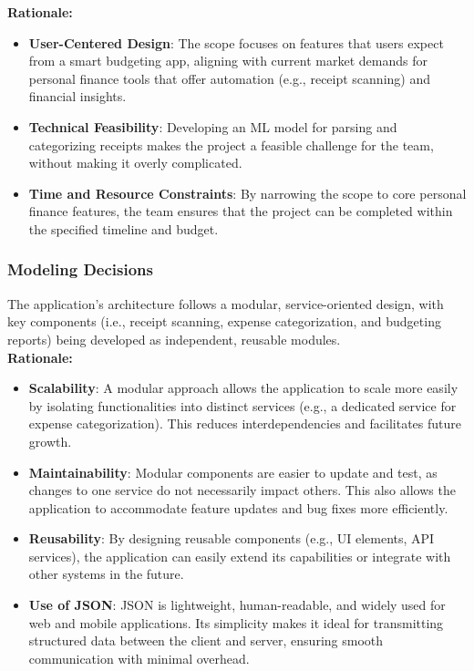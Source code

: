\documentclass[12pt]{article}
\begin{document}
\noindent\textbf{Rationale:}
\begin{itemize}
    \item \textbf{User-Centered Design}: The scope focuses on features that
    users expect from a smart budgeting app, aligning with current market
    demands for personal finance tools that offer automation (e.g., receipt
    scanning) and financial insights. 
    \item \textbf{Technical Feasibility}: Developing an ML model for parsing and
    categorizing receipts makes the project a feasible challenge for the team,
    without making it overly complicated.
    \item \textbf{Time and Resource Constraints}: By narrowing the scope to core
    personal finance features, the team ensures that the project can be
    completed within the specified timeline and budget.
\end{itemize}

\subsubsection{Modeling Decisions}
The application's architecture follows a modular, service-oriented design, with key components (i.e., receipt scanning, expense categorization, and budgeting reports) being developed as independent, reusable modules.\\

\noindent\textbf{Rationale:}
\begin{itemize}
    \item \textbf{Scalability}: A modular approach allows the application to scale more easily by isolating functionalities into distinct services (e.g., a dedicated service for expense categorization). This reduces interdependencies and facilitates future growth.
    \item \textbf{Maintainability}: Modular components are easier to update and test, as changes to one service do not necessarily impact others. This also allows the application to accommodate feature updates and bug fixes more efficiently.
    \item \textbf{Reusability}: By designing reusable components (e.g., UI elements, API services), the application can easily extend its capabilities or integrate with other systems in the future.
    \item \textbf{Use of JSON}: JSON is lightweight, human-readable, and widely used for web and mobile applications. Its simplicity makes it ideal for transmitting structured data between the client and server, ensuring smooth communication with minimal overhead.
\end{itemize}
\end{document}
